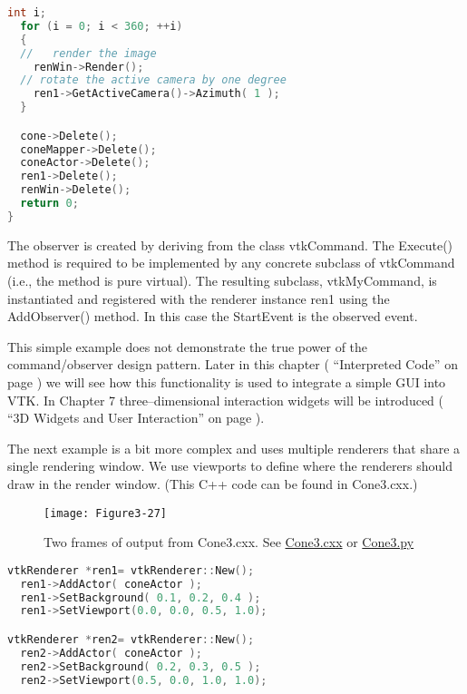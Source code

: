 \begin{description}[leftmargin=0cm,labelindent=0cm]
\begin{lstlisting}[language=C++, caption={}]
  int i;
  for (i = 0; i < 360; ++i)
  {
  //   render the image
    renWin->Render();
  // rotate the active camera by one degree
    ren1->GetActiveCamera()->Azimuth( 1 );
  }

  cone->Delete();
  coneMapper->Delete();
  coneActor->Delete();
  ren1->Delete();
  renWin->Delete();
  return 0;
}
\end{lstlisting}

The observer is created by deriving from the class vtkCommand. The Execute() method is required to be implemented by any concrete subclass of vtkCommand (i.e., the method is pure virtual). The resulting subclass, vtkMyCommand, is instantiated and registered with the renderer instance ren1 using the AddObserver() method. In this case the StartEvent is the observed event.

This simple example does not demonstrate the true power of the command/observer design pattern. Later in this chapter ( ``Interpreted Code'' on page \pageref{subsec:examples_interpreted_code} ) we will see how this functionality is used to integrate a simple GUI into VTK. In Chapter 7 three--dimensional interaction widgets will be introduced ( ``3D Widgets and User Interaction''  on page \pageref{sec:3D_widgets_user_interaction} ).

\item[Creating Multiple Renderers.]

The next example is a bit more complex and uses multiple renderers that share a single rendering window. We use viewports to define where the renderers should draw in the render window. (This C++ code can be found in Cone3.cxx.)

\begin{figure}[!htb]
  \centering
  \texttt{[image: Figure3-27]}\\
  \caption{Two frames of output from Cone3.cxx. See  \href{https://lorensen.github.io/VTKExamples/site/Cxx/Rendering/Cone3/}{Cone3.cxx} or \href{https://lorensen.github.io/VTKExamples/site/Python/Rendering/Cone3/}{Cone3.py}}\label{fig:Figure3-27}
\end{figure}

\begin{lstlisting}[language=C++, caption={Cone3.cxx}]
vtkRenderer *ren1= vtkRenderer::New();
  ren1->AddActor( coneActor );
  ren1->SetBackground( 0.1, 0.2, 0.4 );
  ren1->SetViewport(0.0, 0.0, 0.5, 1.0);

vtkRenderer *ren2= vtkRenderer::New();
  ren2->AddActor( coneActor );
  ren2->SetBackground( 0.2, 0.3, 0.5 );
  ren2->SetViewport(0.5, 0.0, 1.0, 1.0);


\end{lstlisting}
\end{description}
